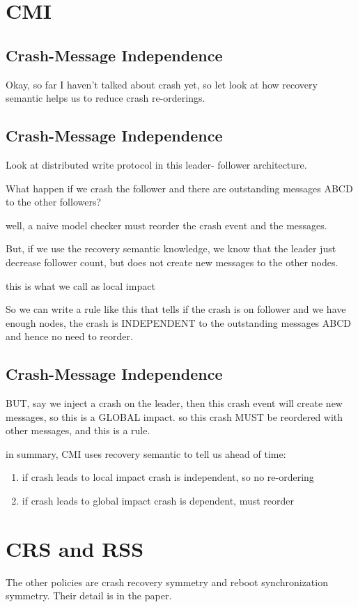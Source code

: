 \section{CMI}

\subsection{Crash-Message Independence}

Okay, so far I haven't talked about crash yet, so let look at how recovery
semantic helps us to reduce crash re-orderings.

\subsection{Crash-Message Independence}

Look at distributed write protocol in this leader- follower architecture.

What happen if we crash the follower and there are outstanding messages ABCD to
the other followers?

well, a naive model checker must reorder the crash event and the messages.

But, if we use the recovery semantic knowledge, we know that the leader just
decrease follower count, but does not create new messages to the other nodes.

this is what we call as local impact

So we can write a rule like this that tells if the crash is on follower and we
have enough nodes, the crash is INDEPENDENT to the outstanding messages ABCD and
hence no need to reorder.

\subsection{Crash-Message Independence}

BUT, say we inject a crash on the leader, then this crash event will create new
messages, so this is a GLOBAL impact. so this crash MUST be reordered with other
messages, and this is a rule.

in summary, CMI uses recovery semantic to tell us ahead of time:

\begin{enumerate}
\item if crash leads to local impact crash is independent, so no re-ordering
\item if crash leads to global impact crash is dependent, must reorder
\end{enumerate}

\section{CRS and RSS}

The other policies are crash recovery symmetry and reboot synchronization
symmetry. Their detail is in the paper.

